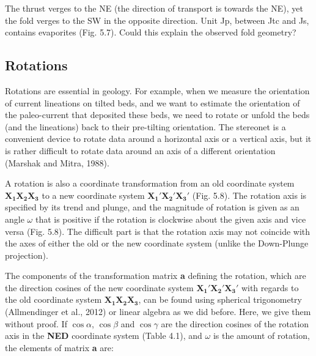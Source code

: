 \documentclass[a4paper , 12pt]{book}
\begin{document}
The thrust verges to the NE (the direction of transport is towards the NE), yet the fold verges to the SW in the opposite direction. Unit Jp, between Jtc and Js, contains evaporites (Fig. 5.7). Could this explain the observed fold geometry?

\subsection{Rotations}

Rotations are essential in geology. For example, when we measure the orientation of current lineations on tilted beds, and we want to estimate the orientation of the paleo-current that deposited these beds, we need to rotate or unfold the beds (and the lineations) back to their pre-tilting orientation. The stereonet is a convenient device to rotate data around a horizontal axis or a vertical axis, but it is rather difficult to rotate data around an axis of a different orientation (Marshak and Mitra, 1988). 

A rotation is also a coordinate transformation from an old coordinate system $\mathbf{X_1}\mathbf{X_2}\mathbf{X_3}$ to a new coordinate system $\mathbf{X_1\text{$'$}}\mathbf{X_2\text{$'$}}\mathbf{X_3\text{$'$}}$ (Fig. 5.8). The rotation axis is specified by its trend and plunge, and the magnitude of rotation is given as an angle $\omega$ that is positive if the rotation is clockwise about the given axis and vice versa (Fig. 5.8). The difficult part is that the rotation axis may not coincide with the axes of either the old or the new coordinate system (unlike the Down-Plunge projection).

The components of the transformation matrix \textbf{a} defining the rotation, which are the direction cosines of the new coordinate system $\mathbf{X_1\text{$'$}}\mathbf{X_2\text{$'$}}\mathbf{X_3\text{$'$}}$ with regards to the old coordinate system $\mathbf{X_1}\mathbf{X_2}\mathbf{X_3}$, can be found using spherical trigonometry (Allmendinger et al., 2012) or linear algebra as we did before. Here, we give them without proof. If $\cos\alpha$, $\cos\beta$ and $\cos\gamma$ are the direction cosines of the rotation axis in the \textbf{NED} coordinate system (Table 4.1), and $\omega$ is the amount of rotation, the elements of matrix \textbf{a} are:
\end{document}
